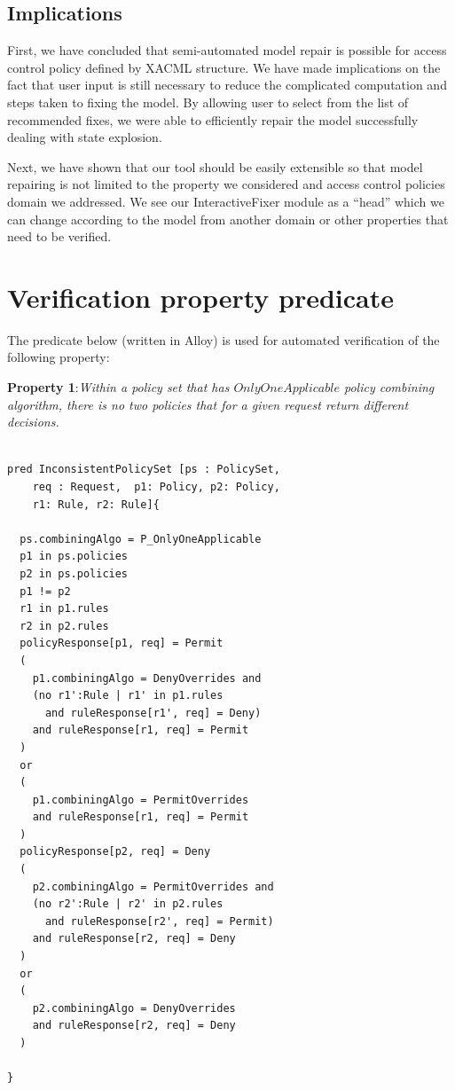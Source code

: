 \documentclass{acm_proc_article-sp}
\begin{document}
\subsection{Implications}

First, we have concluded that semi-automated model repair is possible for access control policy defined by XACML structure. 
We have made implications on the fact that user input is still necessary to reduce the complicated computation and steps taken to fixing the model. By allowing user to select from the list of recommended fixes, we were able to efficiently repair the model successfully dealing with state explosion.

Next, we have shown that our tool should be easily extensible so that model repairing is not limited to the property we considered and access control policies domain we addressed. We see our InteractiveFixer module as a ``head'' which we can change according to the model from another domain or other properties that need to be verified. 


{}


\appendix
\section{Verification property predicate} \label{A}

The predicate below (written in Alloy) is used for automated verification of the following property:

\textbf{Property 1}:\textit{Within a policy set that has $OnlyOneApplicable$ policy combining algorithm, there is no two policies that for a given request return different decisions.}

\begin{verbatim}

pred InconsistentPolicySet [ps : PolicySet, 
    req : Request,  p1: Policy, p2: Policy, 
    r1: Rule, r2: Rule]{

  ps.combiningAlgo = P_OnlyOneApplicable 
  p1 in ps.policies
  p2 in ps.policies
  p1 != p2
  r1 in p1.rules
  r2 in p2.rules
  policyResponse[p1, req] = Permit
  (
    p1.combiningAlgo = DenyOverrides and
    (no r1':Rule | r1' in p1.rules 
      and ruleResponse[r1', req] = Deny)
    and ruleResponse[r1, req] = Permit
  )
  or
  (
    p1.combiningAlgo = PermitOverrides
    and ruleResponse[r1, req] = Permit
  )
  policyResponse[p2, req] = Deny
  (
    p2.combiningAlgo = PermitOverrides and
    (no r2':Rule | r2' in p2.rules 
      and ruleResponse[r2', req] = Permit)
    and ruleResponse[r2, req] = Deny
  )
  or
  (
    p2.combiningAlgo = DenyOverrides
    and ruleResponse[r2, req] = Deny
  )

}

\end{verbatim}



\balancecolumns
\end{document}
